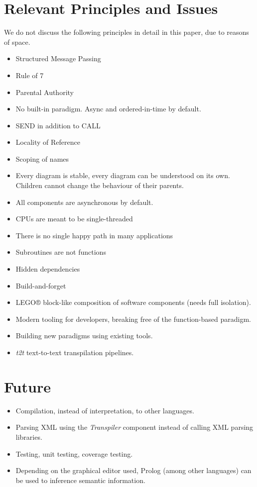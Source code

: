\documentclass[10pt]{acmart}
\begin{document}
\section{Relevant Principles and Issues}
We do not discuss the following principles in detail in this paper, due
to reasons of space.

\begin{itemize}
\item Structured Message Passing
\item Rule of 7
\item Parental Authority
\item No built-in paradigm. Async and ordered-in-time by default.
\item SEND in addition to CALL
\item Locality of Reference
\item Scoping of names
\item Every diagram is stable, every diagram can be understood on its own.
Children cannot change the behaviour of their parents.
\item All components are asynchronous by default.
\item CPUs are meant to be single-threaded
\item There is no single happy path in many applications
\item Subroutines are not functions
\item Hidden dependencies
\item Build-and-forget
\item LEGO® block-like composition of software components (needs full
isolation).
\item Modern tooling for developers, breaking free of the function-based
paradigm.
\item Building new paradigms using existing tools.
\item \emph{t2t} text-to-text transpilation pipelines.
\end{itemize}

\section{Future}
\begin{itemize}
\item Compilation, instead of interpretation, to other languages.

\item Parsing XML using the \emph{Transpiler} component instead of calling XML parsing libraries.

\item Testing, unit testing, coverage testing.

\item Depending on the graphical editor used, Prolog (among other languages)
can be used to inference semantic information.
\end{itemize}
\end{document}
